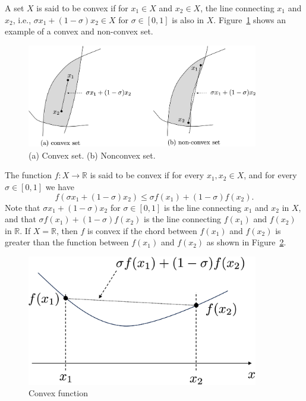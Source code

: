 \documentclass{article}
\begin{document}
A set $X$ is said to be convex if for $x_1\in X$ and $x_2\in X$, the line connecting $x_1$ and $x_2$, i.e., $\sigma x_1 + (1-\sigma)x_2\in X$ for $\sigma\in[0, 1]$ is also in $X$.  Figure~\ref{fig:convex_set} shows an example of a convex and non-convex set.
\begin{figure}[hbt]
  \includegraphics[width=0.9\textwidth]{figures/convex_set}
  \caption{(a) Convex set.  (b) Nonconvex set.}
  \label{fig:convex_set}
\end{figure}

The function $f:X\to \mathbb{R}$ is said to be convex if for every $x_1, x_2\in X$, and for every $\sigma\in[0, 1]$ we have
\[
f(\sigma x_1 + (1-\sigma)x_2) \leq \sigma f(x_1) + (1-\sigma)f(x_2).
\]
Note that $\sigma x_1 + (1-\sigma)x_2$ for $\sigma\in[0, 1]$ is the line connecting $x_1$ and $x_2$ in $X$, and that $\sigma f(x_1) + (1-\sigma)f(x_2)$ is the line connecting $f(x_1)$ and $f(x_2)$ in $\mathbb{R}$.  If $X=\mathbb{R}$, then $f$ is convex if the chord between $f(x_1)$ and $f(x_2)$ is greater than the function between $f(x_1)$ and $f(x_2)$ as shown in Figure~\ref{fig:convex_function}.
\begin{figure}[hbt]
  \includegraphics[width=0.9\textwidth]{figures/convex_function}
  \caption{Convex function}
  \label{fig:convex_function}
\end{figure}
\end{document}

